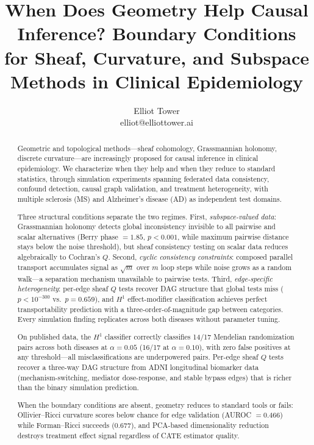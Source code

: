 \documentclass{article}
\title{When Does Geometry Help Causal Inference? Boundary Conditions for Sheaf, Curvature, and Subspace Methods in Clinical Epidemiology}
\author{\name Elliot Tower \\
      \email elliot@elliottower.ai}
\begin{document}
\maketitle

\begin{abstract}
Geometric and topological methods---sheaf cohomology, Grassmannian holonomy, discrete curvature---are increasingly proposed for causal inference in clinical epidemiology. We characterize when they help and when they reduce to standard statistics, through simulation experiments spanning federated data consistency, confound detection, causal graph validation, and treatment heterogeneity, with multiple sclerosis (MS) and Alzheimer's disease (AD) as independent test domains.

Three structural conditions separate the two regimes. First, \emph{subspace-valued data}: Grassmannian holonomy detects global inconsistency invisible to all pairwise and scalar alternatives (Berry phase $= 1.85$, $p < 0.001$, while maximum pairwise distance stays below the noise threshold), but sheaf consistency testing on scalar data reduces algebraically to Cochran's $Q$. Second, \emph{cyclic consistency constraints}: composed parallel transport accumulates signal as $\sqrt{m}$ over $m$ loop steps while noise grows as a random walk---a separation mechanism unavailable to pairwise tests. Third, \emph{edge-specific heterogeneity}: per-edge sheaf $Q$ tests recover DAG structure that global tests miss ($p < 10^{-300}$ vs.\ $p = 0.659$), and $H^1$ effect-modifier classification achieves perfect transportability prediction with a three-order-of-magnitude gap between categories. Every simulation finding replicates across both diseases without parameter tuning.

On published data, the $H^1$ classifier correctly classifies 14/17 Mendelian randomization pairs across both diseases at $\alpha = 0.05$ (16/17 at $\alpha = 0.10$), with zero false positives at any threshold---all misclassifications are underpowered pairs. Per-edge sheaf $Q$ tests recover a three-way DAG structure from ADNI longitudinal biomarker data (mechanism-switching, mediator dose-response, and stable bypass edges) that is richer than the binary simulation prediction.

When the boundary conditions are absent, geometry reduces to standard tools or fails: Ollivier--Ricci curvature scores below chance for edge validation (AUROC $= 0.466$) while Forman--Ricci succeeds ($0.677$), and PCA-based dimensionality reduction destroys treatment effect signal regardless of CATE estimator quality.
\end{abstract}
\end{document}
